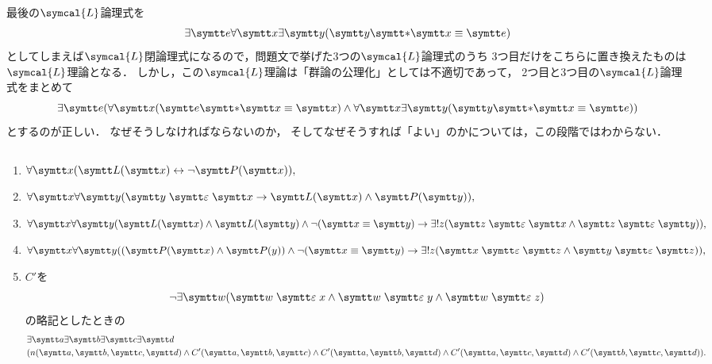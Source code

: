 最後の\(\symcal{L}\)論理式を
\[
	\exists \obj{e} \forall \obj{x} \exists \obj{y} \paren{\obj{y} \obj{\ast} \obj{x} \objeq \obj{e}}
\]
としてしまえば\(\symcal{L}\)閉論理式になるので，問題文で挙げた3つの\(\symcal{L}\)論理式のうち
3つ目だけをこちらに置き換えたものは\(\symcal{L}\)理論となる．
しかし，この\(\symcal{L}\)理論は「群論の公理化」としては不適切であって，
2つ目と3つ目の\(\symcal{L}\)論理式をまとめて
\[
	\exists \obj{e} \paren{
		\forall \obj{x} \paren{\obj{e} \obj{\ast} \obj{x} \objeq \obj{x}}
		\land \forall \obj{x} \exists \obj{y} \paren{\obj{y} \obj{\ast} \obj{x} \objeq \obj{e}}
	}
\]
とするのが正しい．
なぜそうしなければならないのか，
そしてなぜそうすれば「よい」のかについては，この段階ではわからない．

\subsection*{}

\begin{enumerate}
	\NewDocumentCommand{\LiesOn}{}{\mathrel{\obj{\varepsilon}}}
	\item \(\forall \obj{x} \paren{\apply{\obj{L}}{\obj{x}} \formulaequiv \lnot \apply{\obj{P}}{\obj{x}}},\)
	\item \(\forall \obj{x} \forall \obj{y} \paren{\obj{y} \LiesOn \obj{x} \to \apply{\obj{L}}{\obj{x}} \land \apply{\obj{P}}{\obj{y}}},\)
	\item \(\forall \obj{x} \forall \obj{y} \paren{\apply{\obj{L}}{\obj{x}} \land \apply{\obj{L}}{\obj{y}} \land \lnot \paren{\obj{x} \objeq \obj{y}}
		      \to \uexists z \paren{\obj{z} \LiesOn \obj{x} \land \obj{z} \LiesOn \obj{y}}},\)
	\item \(\forall \obj{x} \forall \obj{y} \paren{\paren{\apply{\obj{P}}{\obj{x}} \land \apply{\obj{P}}{y}} \land \lnot \paren{\obj{x} \objeq \obj{y}}
		      \to \uexists z \paren{\obj{x} \LiesOn \obj{z} \land \obj{y} \LiesOn \obj{z}}},\)
	\item \(C'\)を
	      \[
		      \lnot \exists \obj{w} \paren{\obj{w} \LiesOn x \land \obj{w} \LiesOn y \land \obj{w} \LiesOn z}
	      \]
	      の略記としたときの
	      \begin{align*}
		       & \exists \obj{a} \exists \obj{b} \exists \obj{c} \exists \obj{d} \\
		       & \paren{
			      \apply{n}{\obj{a}, \obj{b}, \obj{c}, \obj{d}}
			      \land \apply{C'}{\obj{a}, \obj{b}, \obj{c}}
			      \land \apply{C'}{\obj{a}, \obj{b}, \obj{d}}
			      \land \apply{C'}{\obj{a}, \obj{c}, \obj{d}}
			      \land \apply{C'}{\obj{b}, \obj{c}, \obj{d}}
		      }.
	      \end{align*}
\end{enumerate}


